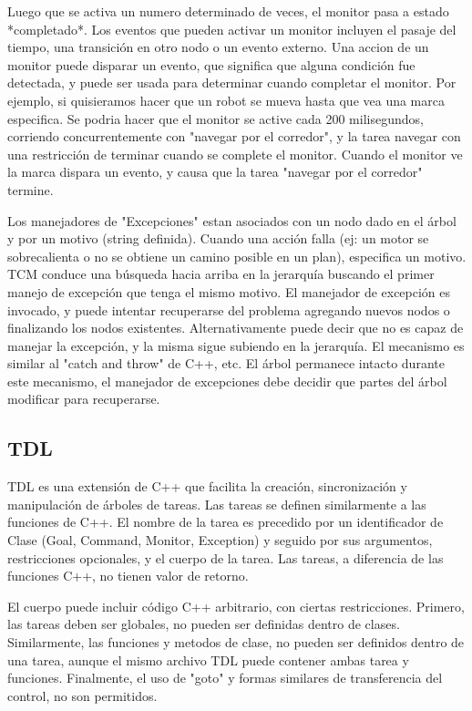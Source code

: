 \documentclass[a4paper, 11pt, oneside]{article}
\begin{document}
Luego que se activa un numero determinado de veces, el monitor pasa a 
estado *completado*.
Los eventos que pueden activar un monitor incluyen el pasaje del tiempo, una 
transición en otro nodo o un evento externo.
Una accion de un monitor puede disparar un evento, que significa que alguna 
condición fue detectada, y puede ser usada para determinar
cuando completar el monitor.
Por ejemplo, si quisieramos hacer que un robot se mueva hasta que vea una 
marca especifica. Se podria hacer que el monitor se active cada 
200 milisegundos, corriendo concurrentemente con "navegar por el corredor", y 
la tarea navegar con una restricción de terminar cuando
se complete el monitor.
Cuando el monitor ve la marca dispara un evento, y causa que la tarea "navegar 
por el corredor" termine.

Los manejadores de "Excepciones" estan asociados con un nodo dado en el árbol 
y por un motivo (string definida).
Cuando una acción falla (ej: un motor se sobrecalienta o no se obtiene un 
camino posible en un plan), especifica un motivo.
TCM conduce una búsqueda hacia arriba en la jerarquía buscando el primer 
manejo de excepción que tenga el mismo motivo.
El manejador de excepción es invocado, y puede intentar recuperarse del 
problema agregando nuevos nodos o finalizando los nodos existentes.
Alternativamente puede decir que no es capaz de manejar la excepción, y la 
misma sigue subiendo en la jerarquía.
El mecanismo es similar al "catch and throw" de C++, etc.
El árbol permanece intacto durante este mecanismo, el manejador de excepciones 
debe decidir que partes del árbol modificar para recuperarse.

\subsection{TDL}

TDL es una extensión de C++ que facilita la creación, sincronización y 
manipulación de árboles de tareas.
Las tareas se definen similarmente a las funciones de C++.
El nombre de la tarea es precedido por un identificador de Clase (Goal, 
Command, Monitor, Exception) y seguido por sus argumentos,
restricciones opcionales, y el cuerpo de la tarea.
Las tareas, a diferencia de las funciones C++, no tienen valor de retorno.

El cuerpo puede incluir código C++ arbitrario, con ciertas restricciones.
Primero, las tareas deben ser globales, no pueden ser definidas dentro de 
clases. Similarmente, las funciones
y metodos de clase, no pueden ser definidos dentro de una tarea, aunque el 
mismo archivo TDL puede contener ambas tarea y funciones.
Finalmente, el uso de "goto" y formas similares de transferencia del control, 
no son permitidos.
\end{document}
